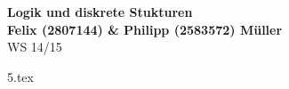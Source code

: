 \documentclass[letterpaper, 12pt, a4paper]{article}
\begin{document}


	\begin{center}
	{\Large{\bfseries{Logik und diskrete Stukturen}}}\\[0.5cm]
	{\large{\bfseries{Felix (2807144) \& Philipp (2583572) Müller}}}\\[0.4cm]
	WS 14/15
	\end{center}


	{5.tex}
\end{document}

